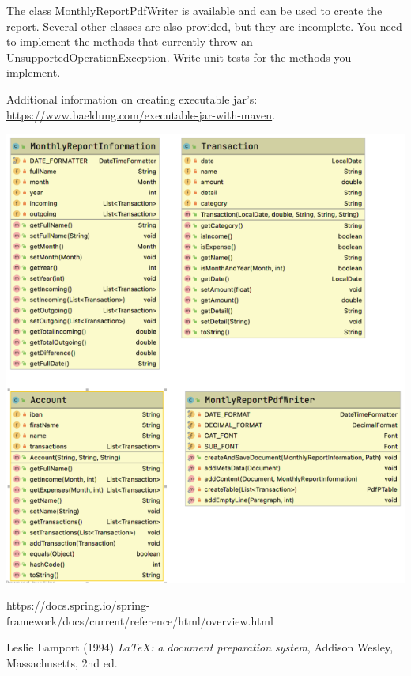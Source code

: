\begin{oefening}
The class MonthlyReportPdfWriter is available and can be used to create the report. 
Several other classes are also provided, but they are incomplete. You need to implement the methods that currently throw an UnsupportedOperationException. Write unit tests for the methods you implement. 

Additional information on creating executable jar's: \url{https://www.baeldung.com/executable-jar-with-maven}.

\includegraphics[width=\textwidth]{./images/chapter3/exercise-class-diagram} 

\end{oefening}

\begin{thebibliography}{9}
https://docs.spring.io/spring-framework/docs/current/reference/html/overview.html

Leslie Lamport (1994) \emph{\LaTeX: a document preparation system}, Addison
Wesley, Massachusetts, 2nd ed.


\end{thebibliography}
